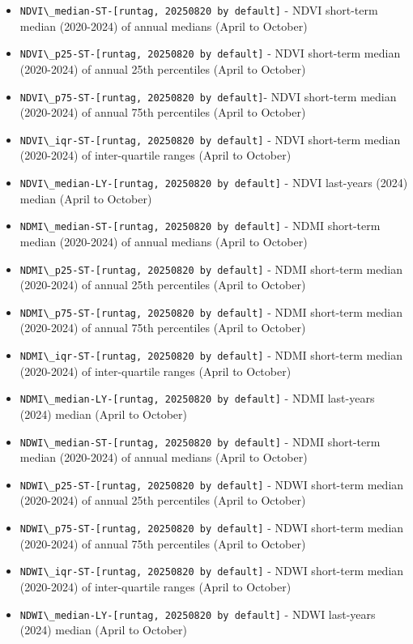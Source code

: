 \documentclass[
]{book}
\newcommand{\passthrough}[1]{#1}
\begin{document}
\begin{itemize}
\item
  \passthrough{\lstinline!NDVI\_median-ST-[runtag, 20250820 by default]!} - NDVI short-term median (2020-2024) of annual medians (April to October)
\item
  \passthrough{\lstinline!NDVI\_p25-ST-[runtag, 20250820 by default]!} - NDVI short-term median (2020-2024) of annual 25th percentiles (April to October)
\item
  \passthrough{\lstinline!NDVI\_p75-ST-[runtag, 20250820 by default]!}- NDVI short-term median (2020-2024) of annual 75th percentiles (April to October)
\item
  \passthrough{\lstinline!NDVI\_iqr-ST-[runtag, 20250820 by default]!} - NDVI short-term median (2020-2024) of inter-quartile ranges (April to October)
\item
  \passthrough{\lstinline!NDVI\_median-LY-[runtag, 20250820 by default]!} - NDVI last-years (2024) median (April to October)
\item
  \passthrough{\lstinline!NDMI\_median-ST-[runtag, 20250820 by default]!} - NDMI short-term median (2020-2024) of annual medians (April to October)
\item
  \passthrough{\lstinline!NDMI\_p25-ST-[runtag, 20250820 by default]!} - NDMI short-term median (2020-2024) of annual 25th percentiles (April to October)
\item
  \passthrough{\lstinline!NDMI\_p75-ST-[runtag, 20250820 by default]!} - NDMI short-term median (2020-2024) of annual 75th percentiles (April to October)
\item
  \passthrough{\lstinline!NDMI\_iqr-ST-[runtag, 20250820 by default]!} - NDMI short-term median (2020-2024) of inter-quartile ranges (April to October)
\item
  \passthrough{\lstinline!NDMI\_median-LY-[runtag, 20250820 by default]!} - NDMI last-years (2024) median (April to October)
\item
  \passthrough{\lstinline!NDWI\_median-ST-[runtag, 20250820 by default]!} - NDMI short-term median (2020-2024) of annual medians (April to October)
\item
  \passthrough{\lstinline!NDWI\_p25-ST-[runtag, 20250820 by default]!} - NDWI short-term median (2020-2024) of annual 25th percentiles (April to October)
\item
  \passthrough{\lstinline!NDWI\_p75-ST-[runtag, 20250820 by default]!} - NDWI short-term median (2020-2024) of annual 75th percentiles (April to October)
\item
  \passthrough{\lstinline!NDWI\_iqr-ST-[runtag, 20250820 by default]!} - NDWI short-term median (2020-2024) of inter-quartile ranges (April to October)
\item
  \passthrough{\lstinline!NDWI\_median-LY-[runtag, 20250820 by default]!} - NDWI last-years (2024) median (April to October)
\end{itemize}
\end{document}

